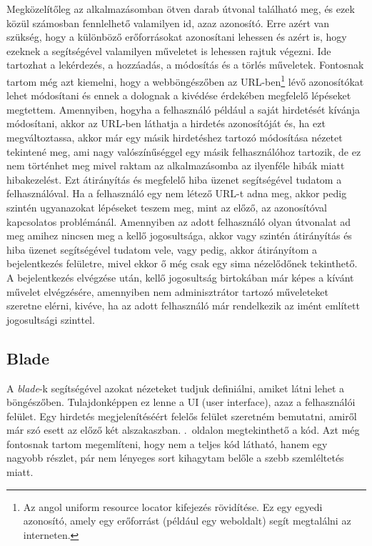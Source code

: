 \documentclass[]{thesis-ekf}
\theoremstyle{definition}
\theoremstyle{remark}
\begin{document}
		Megközelítőleg az alkalmazásomban ötven darab útvonal található meg, és ezek közül számosban fennlelhető valamilyen id, azaz azonosító. Erre azért van szükség, hogy a különböző erőforrásokat azonosítani lehessen és azért is, hogy ezeknek a segítségével valamilyen műveletet is lehessen rajtuk végezni. Ide tartozhat a lekérdezés, a hozzáadás, a módosítás és a törlés műveletek. Fontosnak tartom még azt kiemelni, hogy a webböngészőben az URL-ben\footnote{Az angol uniform resource locator kifejezés rövidítése. Ez egy egyedi azonosító, amely egy erőforrást (például egy weboldalt) segít megtalálni az interneten.} lévő azonosítókat lehet módosítani és ennek a dolognak a kivédése érdekében megfelelő lépéseket megtettem. Amennyiben, hogyha a felhasználó például a saját hirdetését kívánja módosítani, akkor az URL-ben láthatja a hirdetés azonosítóját és, ha ezt megváltoztassa, akkor már egy másik hirdetéshez tartozó módosítása nézetet tekintené meg, ami nagy valószínűséggel egy másik felhasználóhoz tartozik, de ez nem történhet meg mivel raktam az alkalmazásomba az ilyenféle hibák miatt hibakezelést. Ezt átirányítás és megfelelő hiba üzenet segítségével tudatom a felhasználóval. Ha a felhasználó egy nem létező URL-t adna meg, akkor pedig szintén ugyanazokat lépéseket teszem meg, mint az előző, az azonosítóval kapcsolatos problémánál. Amennyiben az adott felhasználó olyan útvonalat ad meg amihez nincsen meg a kellő jogosultsága, akkor vagy szintén átirányítás és hiba üzenet segítségével tudatom vele, vagy pedig, akkor átirányítom a bejelentkezés felületre, mivel ekkor ő még csak egy sima nézelődőnek tekinthető. A bejelentkezés elvégzése után, kellő jogosultság birtokában már képes a kívánt művelet elvégzésére, amennyiben nem adminisztrátor tartozó műveleteket szeretne elérni, kivéve, ha az adott felhasználó már rendelkezik az imént említett jogosultsági szinttel.
	
	\subsection{Blade}\label{sc-blade}
		A \emph{blade}-k segítségével azokat nézeteket tudjuk definiálni, amiket látni lehet a böngészőben. Tulajdonképpen ez lenne a UI (user interface), azaz a felhasználói felület. Egy hirdetés megjelenítéséért felelős felület szeretném bemutatni, amiről már szó esett az előző két alszakaszban. \Az{\pageref{kod-blade}}.~oldalon megtekinthető a kód. Azt még fontosnak tartom megemlíteni, hogy nem a teljes kód látható, hanem egy nagyobb részlet, pár nem lényeges sort kihagytam belőle a szebb szemléltetés miatt.
	
\end{document}
